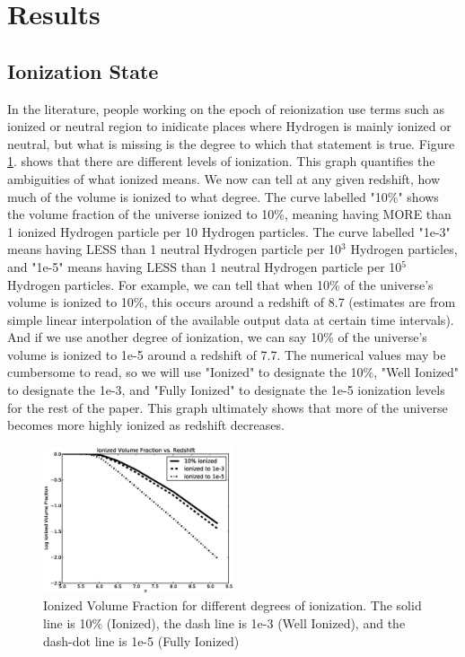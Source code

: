 \section{Results}
\label{Results}

\subsection{Ionization State}


In the literature, people working on the epoch of reionization use terms such as ionized or neutral region to inidicate places where Hydrogen is mainly ionized or neutral, but what is missing is the degree to which that statement is true.  Figure \ref{Log_Ionized_vs_Redshift}. shows that there are different levels of ionization.  This graph quantifies the ambiguities of what ionized means.  We now can tell at any given redshift, how much of the volume is ionized to what degree.  The curve labelled "10\%" shows the volume fraction of the universe ionized to 10\%, meaning having MORE than 1 ionized Hydrogen particle per 10 Hydrogen particles.  The curve labelled "1e-3" means having LESS than 1 neutral Hydrogen particle per 10$^3$ Hydrogen particles, and "1e-5" means having LESS than 1 neutral Hydrogen particle per 10$^5$ Hydrogen particles.  For example, we can tell that when 10\% of the universe's volume is ionized to 10\%, this occurs around a redshift of 8.7 (estimates are from simple linear interpolation of the available output data at certain time intervals).  And if we use another degree of ionization, we can say 10\% of the universe's volume is ionized to 1e-5 around a redshift of 7.7.  The numerical values may be cumbersome to read, so we will use "Ionized" to designate the 10\%, "Well Ionized" to designate the 1e-3, and "Fully Ionized" to designate the 1e-5 ionization levels for the rest of the paper.  This graph ultimately shows that more of the universe becomes more highly ionized as redshift decreases.

\begin{figure}
  \includegraphics[width=0.5\textwidth]{bLog_Ionized_vs_Redshift.eps}
  \caption{\footnotesize Ionized Volume Fraction for different degrees of ionization.  
    The solid line is 10\% (Ionized), the dash line is 1e-3 (Well Ionized), and the dash-dot line is 1e-5 (Fully Ionized)}
  \label{Log_Ionized_vs_Redshift}
\end{figure}


